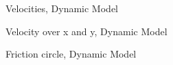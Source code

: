 \begin{figure}[ht]
	\centering
  	
	\caption{Velocities, Dynamic Model}
	\label{fig:SimDyn_v}
\end{figure}

\begin{figure}[ht]
	\centering
  	
	\caption{Velocity over x and y, Dynamic Model}
	\label{fig:SimDyn_v_over_xy}
\end{figure}

\begin{figure}[ht]
	\centering
  	
	\caption{Friction circle, Dynamic Model}
	\label{fig:SimDyn_fcircle}
\end{figure}
